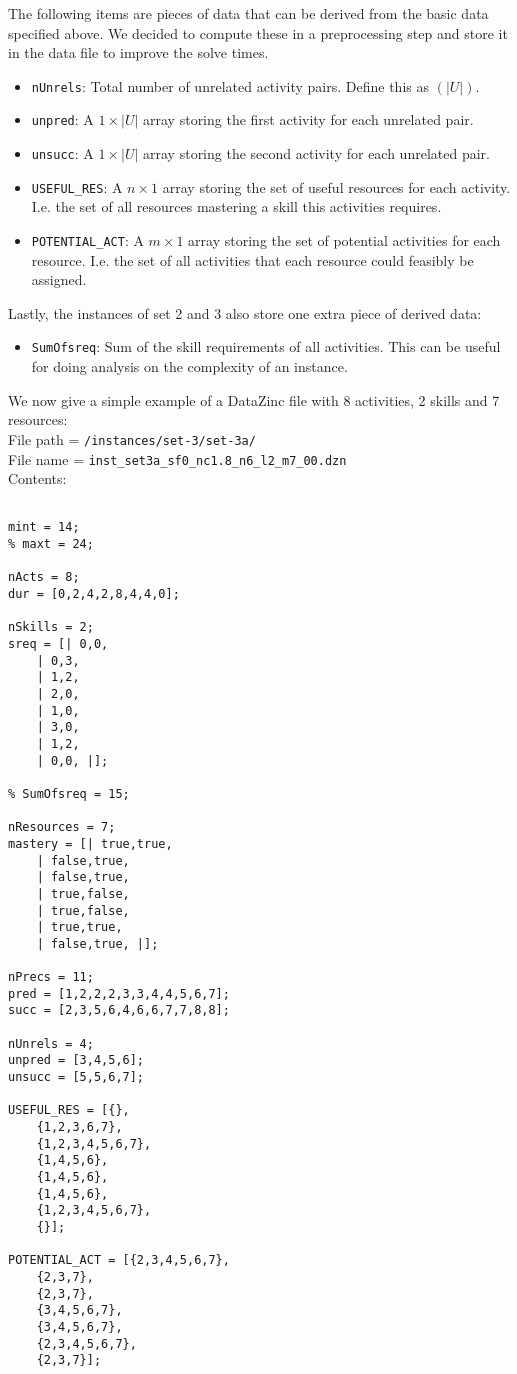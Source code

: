 \documentclass[12pt]{article}
\begin{document}
The following items are pieces of data that can be derived from the basic 
data specified above.
We decided to compute these in a preprocessing step and store it in the data file to 
improve the solve times.
\begin{itemize}
    \item {\tt nUnrels}: Total number of unrelated activity pairs. Define this as $(|U|)$.
    \item {\tt unpred}: A $1\times |U|$ array storing the first activity for each unrelated pair.
    \item {\tt unsucc}: A $1\times |U|$ array storing the second activity for each unrelated pair.
    \item {\tt USEFUL\_RES}: A $n\times 1$ array storing the set of useful resources for each activity.
        I.e. the set of all resources mastering a skill this activities requires.
    \item {\tt POTENTIAL\_ACT}: A $m\times 1$ array storing the set of potential activities for each resource.
        I.e. the set of all activities that each resource could feasibly be assigned.
\end{itemize}

Lastly, the instances of set 2 and 3 also store one extra piece of derived data:
\begin{itemize}
    \item {\tt SumOfsreq}: Sum of the skill requirements of all activities. This can
        be useful for doing analysis on the complexity of an instance.
\end{itemize}

We now give a simple example of a DataZinc file with 8 activities, 2 skills and 7 resources:\\[3pt]
File path = {\tt /instances/set-3/set-3a/}\\[3pt]
File name = {\tt inst\_set3a\_sf0\_nc1.8\_n6\_l2\_m7\_00.dzn}\\[3pt]
Contents:

\begin{lstlisting}[language=minizinc]
% seed = 0

mint = 14;
% maxt = 24;

nActs = 8;
dur = [0,2,4,2,8,4,4,0];

nSkills = 2;
sreq = [| 0,0,
    | 0,3,
    | 1,2,
    | 2,0,
    | 1,0,
    | 3,0,
    | 1,2,
    | 0,0, |];

% SumOfsreq = 15;

nResources = 7;
mastery = [| true,true,
    | false,true,
    | false,true,
    | true,false,
    | true,false,
    | true,true,
    | false,true, |];

nPrecs = 11;
pred = [1,2,2,2,3,3,4,4,5,6,7];
succ = [2,3,5,6,4,6,6,7,7,8,8];

nUnrels = 4;
unpred = [3,4,5,6];
unsucc = [5,5,6,7];

USEFUL_RES = [{},
    {1,2,3,6,7},
    {1,2,3,4,5,6,7},
    {1,4,5,6},
    {1,4,5,6},
    {1,4,5,6},
    {1,2,3,4,5,6,7},
    {}];

POTENTIAL_ACT = [{2,3,4,5,6,7},
    {2,3,7},
    {2,3,7},
    {3,4,5,6,7},
    {3,4,5,6,7},
    {2,3,4,5,6,7},
    {2,3,7}];
\end{lstlisting}
\end{document}
